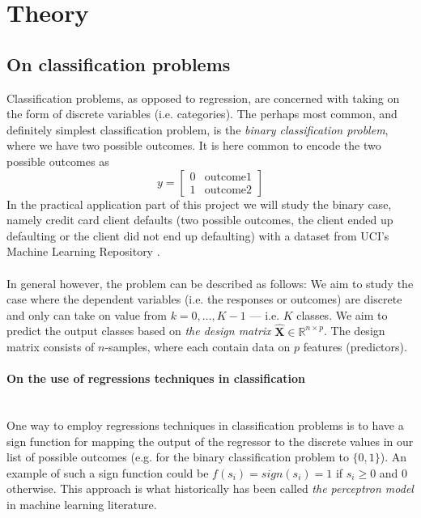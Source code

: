 \documentclass[10pt, a4paper, twocolumn]{article}
\newcommand{\myparagraph}[1]{\paragraph{#1}\mbox{}\\}
\begin{document}
\section{Theory}
	\subsection{On classification problems}
		Classification problems, as opposed to regression, are concerned with taking on the form of discrete variables (i.e. categories). The perhaps most common, and definitely simplest classification problem, is the \emph{binary classification problem}, where we have two possible outcomes. It is here common to encode the two possible outcomes as
			$$ y = \begin{bmatrix} 0 &\mathrm{outcome 1} \\ 1 & \mathrm{outcome 2} \end{bmatrix} $$
		In the practical application part of this project we will study the binary case, namely credit card client defaults (two possible outcomes, the client ended up defaulting or the client did not end up defaulting) with a dataset from UCI's Machine Learning Repository \cite{UCImlRepoCCdata}. \\\\
		
		In general however, the problem can be described as follows: We aim to study the case where the dependent variables (i.e. the responses or outcomes) are discrete and only can take on value from $k = 0,\dots,K-1$ --- i.e. $K$ classes. We aim to predict the output classes based on \emph{the design matrix} $\mathbf{\hat{X}} \in \mathbb{R} ^{n\times p}$. The design matrix consists of $n$-samples, where each contain data on $p$ features (predictors).
		
	\myparagraph{On the use of regressions techniques in classification}
		One way to employ regressions techniques in classification problems is to have a sign function for mapping the output of the regressor to the discrete values in our list of possible outcomes (e.g. for the binary classification problem to $\{0,1\}$). An example of such a sign function could be $f(s_i)=sign(s_i)=1$ if $s_i\geq 0$ and $0$ otherwise. This approach is what historically has been called \emph{the perceptron model} in machine learning literature.\\\\
		
\end{document}
